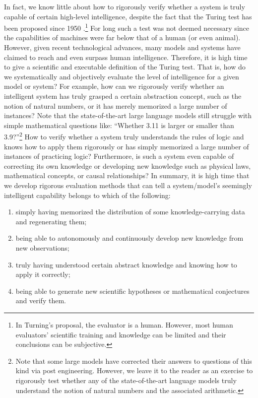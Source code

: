 \documentclass[../../book-main.tex]{subfiles}
\begin{document}
In fact, we know little about how to rigorously verify whether a system is truly capable of certain high-level intelligence, despite the fact that the Turing test has been proposed since 1950 \cite{Turing-1950}.\footnote{In Turning's proposal, the evaluator is a human. However, most human evaluators' scientific training and knowledge can be limited and their conclusions can be subjective.} For long such a test was not deemed necessary since the capabilities of machines were far below that of a human (or even animal). However, given recent technological advances, many models and systems have claimed to reach and even surpass human intelligence. Therefore, it is high time to give a scientific and executable definition of the Turing test. That is, how do we systematically and objectively evaluate the level of intelligence for a given model or system? For example, how can we rigorously verify whether an intelligent system has truly grasped a certain abstraction concept, such as the notion of natural numbers, or it has merely memorized a large number of instances? Note that the state-of-the-art large language models still struggle with simple mathematical questions like: ``Whether 3.11 is larger or smaller than 3.9?''\footnote{Note that some large models have corrected their answers to questions of this kind via post engineering. However, we leave it to the reader as an exercise to rigorously test whether any of the state-of-the-art language models truly understand the notion of natural numbers and the associated arithmetic.} 
How to verify whether a system truly understands the rules of logic and knows how to apply them rigorously or has simply memorized a large number of instances of practicing logic? Furthermore, is such a system even capable of correcting its own knowledge or developing new knowledge such as physical laws, mathematical concepts, or causal relationships? In summary, it is high time that we develop rigorous evaluation methods that can tell a system/model's seemingly intelligent capability belongs to which of the following: 
\begin{enumerate}
    \item simply having memorized the distribution of some knowledge-carrying data and regenerating them;
    \item being able to autonomously and continuously develop new knowledge from new observations;
    \item truly having understood certain abstract knowledge and knowing how to apply it correctly;
    \item being able to generate new scientific hypotheses or mathematical conjectures and verify them.
\end{enumerate}
\end{document}
